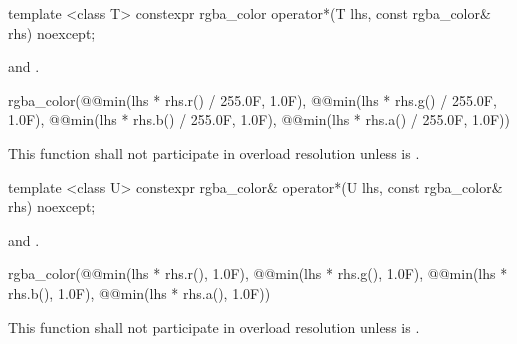 %
\begin{itemdecl}
template <class T>
constexpr rgba_color operator*(T lhs, const rgba_color& rhs) noexcept;
\end{itemdecl}
\begin{itemdescr}
\pnum
\requires
{} and .

\pnum
\returns
\begin{codeblock}
rgba_color(@\stdqualifier{}@min(lhs * rhs.r() / 255.0F, 1.0F), 
  @\stdqualifier{}@min(lhs * rhs.g() / 255.0F, 1.0F),
  @\stdqualifier{}@min(lhs * rhs.b() / 255.0F, 1.0F),
  @\stdqualifier{}@min(lhs * rhs.a() / 255.0F, 1.0F))
\end{codeblock}

\pnum
\remarks
This function shall not participate in overload resolution unless  is .
\end{itemdescr}

%
\begin{itemdecl}
template <class U>
constexpr rgba_color& operator*(U lhs, const rgba_color& rhs) noexcept;
\end{itemdecl}
\begin{itemdescr}
\pnum
\requires
{} and .

\pnum
\returns
\begin{codeblock}
rgba_color(@\stdqualifier{}@min(lhs * rhs.r(), 1.0F),
  @\stdqualifier{}@min(lhs * rhs.g(), 1.0F),
  @\stdqualifier{}@min(lhs * rhs.b(), 1.0F),
  @\stdqualifier{}@min(lhs * rhs.a(), 1.0F))
\end{codeblock}

\pnum
\remarks
This function shall not participate in overload resolution unless  is .
\end{itemdescr}
